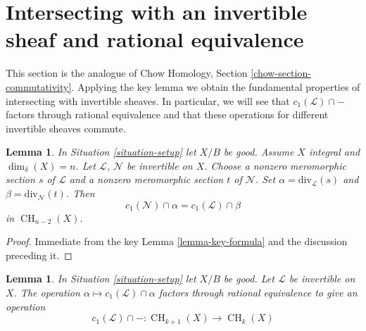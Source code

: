 \documentclass{stacks-project}
\theoremstyle{plain}
\newtheorem{lemma}[subsection]{Lemma}
\theoremstyle{definition}
\theoremstyle{remark}
\numberwithin{equation}{subsection}
\def\CH{\mathop{\mathrm{CH}}\nolimits}
\begin{document}
\section{Intersecting with an invertible sheaf and rational equivalence}
\label{section-commutativity}

\noindent
This section is the analogue of Chow Homology, Section
\ref{chow-section-commutativity}.
Applying the key lemma we obtain the fundamental properties of intersecting
with invertible sheaves. In particular, we will see that
$c_1(\mathcal{L}) \cap -$ factors through rational equivalence and
that these operations for different invertible sheaves commute.

\begin{lemma}
\label{lemma-commutativity-on-integral}
In Situation \ref{situation-setup} let $X/B$ be good.
Assume $X$ integral and $\dim_\delta(X) = n$.
Let $\mathcal{L}$, $\mathcal{N}$ be invertible on $X$.
Choose a nonzero meromorphic section $s$ of $\mathcal{L}$
and a nonzero meromorphic section $t$ of $\mathcal{N}$.
Set $\alpha = \text{div}_\mathcal{L}(s)$ and
$\beta = \text{div}_\mathcal{N}(t)$.
Then
$$
c_1(\mathcal{N}) \cap \alpha
=
c_1(\mathcal{L}) \cap \beta
$$
in $\CH_{n - 2}(X)$.
\end{lemma}

\begin{proof}
Immediate from the key Lemma \ref{lemma-key-formula}
and the discussion preceding it.
\end{proof}

\begin{lemma}
\label{lemma-factors}
In Situation \ref{situation-setup} let $X/B$ be good.
Let $\mathcal{L}$ be invertible on $X$.
The operation $\alpha \mapsto c_1(\mathcal{L}) \cap \alpha$
factors through rational equivalence to give an operation
$$
c_1(\mathcal{L}) \cap - : \CH_{k + 1}(X) \to \CH_k(X)
$$
\end{lemma}
\end{document}
